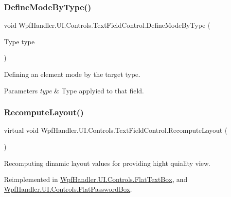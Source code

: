 \subsubsection{\texorpdfstring{Define\+Mode\+By\+Type()}{DefineModeByType()}}
{\footnotesize\ttfamily void Wpf\+Handler.\+U\+I.\+Controls.\+Text\+Field\+Control.\+Define\+Mode\+By\+Type (\begin{DoxyParamCaption}\item[{Type}]{type }\end{DoxyParamCaption})}



Defining an element mode by the target type. 


\begin{DoxyParams}{Parameters}
{\em type} & Type applyied to that field.\\
\hline
\end{DoxyParams}
\mbox{\label{class_wpf_handler_1_1_u_i_1_1_controls_1_1_text_field_control_aaf6c7c81a06ea18f7fd0b709fb9f26b3}} 
\subsubsection{\texorpdfstring{Recompute\+Layout()}{RecomputeLayout()}}
{\footnotesize\ttfamily virtual void Wpf\+Handler.\+U\+I.\+Controls.\+Text\+Field\+Control.\+Recompute\+Layout (\begin{DoxyParamCaption}{ }\end{DoxyParamCaption})\hspace{0.3cm}{\ttfamily [virtual]}}



Recomputing dinamic layout values for providing hight quiality view. 



Reimplemented in \mbox{\hyperlink{class_wpf_handler_1_1_u_i_1_1_controls_1_1_flat_text_box_af96bd0b4244565a1ca7a137d56296cda}{Wpf\+Handler.\+U\+I.\+Controls.\+Flat\+Text\+Box}}, and \mbox{\hyperlink{class_wpf_handler_1_1_u_i_1_1_controls_1_1_flat_password_box_abe285f06393d65f13af4b293f9eb0941}{Wpf\+Handler.\+U\+I.\+Controls.\+Flat\+Password\+Box}}.

